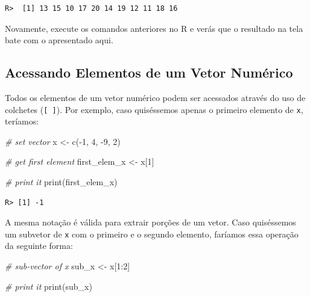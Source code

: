 \documentclass[
  11pt,
]{book}
\newenvironment{Shaded}{\begin{snugshade}}{\end{snugshade}}
\newcommand{\CommentTok}[1]{\textcolor[rgb]{0.37,0.37,0.37}{\textit{#1}}}
\newcommand{\DecValTok}[1]{\textcolor[rgb]{0.06,0.06,0.06}{#1}}
\newcommand{\FunctionTok}[1]{\textcolor[rgb]{0,0,0}{#1}}
\newcommand{\NormalTok}[1]{#1}
\newcommand{\OtherTok}[1]{\textcolor[rgb]{0.37,0.37,0.37}{#1}}
\newcommand{\SpecialCharTok}[1]{\textcolor[rgb]{0,0,0}{#1}}
\begin{document}
\begin{verbatim}
R>  [1] 13 15 10 17 20 14 19 12 11 18 16
\end{verbatim}

Novamente, execute os comandos anteriores no R e verás que o resultado na tela bate com o apresentado aqui.

\hypertarget{acessando-elementos-de-um-vetor-numuxe9rico}{%
\subsection{Acessando Elementos de um Vetor Numérico}\label{acessando-elementos-de-um-vetor-numuxe9rico}}

Todos os elementos de um vetor numérico podem ser acessados através do uso de colchetes (\texttt{{[}\ {]}}). Por exemplo, caso quiséssemos apenas o primeiro elemento de \texttt{x}, teríamos:

\begin{Shaded}
\begin{Highlighting}[]
\CommentTok{\# set vector}
\NormalTok{x }\OtherTok{\textless{}{-}} \FunctionTok{c}\NormalTok{(}\SpecialCharTok{{-}}\DecValTok{1}\NormalTok{, }\DecValTok{4}\NormalTok{, }\SpecialCharTok{{-}}\DecValTok{9}\NormalTok{, }\DecValTok{2}\NormalTok{)}

\CommentTok{\# get first element}
\NormalTok{first\_elem\_x }\OtherTok{\textless{}{-}}\NormalTok{ x[}\DecValTok{1}\NormalTok{]}

\CommentTok{\# print it}
\FunctionTok{print}\NormalTok{(first\_elem\_x)}
\end{Highlighting}
\end{Shaded}

\begin{verbatim}
R> [1] -1
\end{verbatim}

A mesma notação é válida para extrair porções de um vetor. Caso quiséssemos um subvetor de \texttt{x} com o primeiro e o segundo elemento, faríamos essa operação da seguinte forma:

\begin{Shaded}
\begin{Highlighting}[]
\CommentTok{\# sub{-}vector of x}
\NormalTok{sub\_x }\OtherTok{\textless{}{-}}\NormalTok{ x[}\DecValTok{1}\SpecialCharTok{:}\DecValTok{2}\NormalTok{]}

\CommentTok{\# print it}
\FunctionTok{print}\NormalTok{(sub\_x)}
\end{Highlighting}
\end{Shaded}
\end{document}
